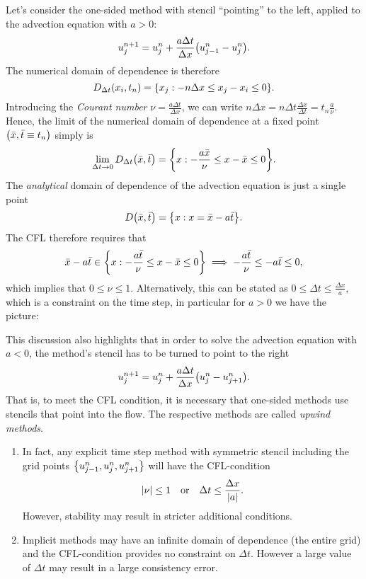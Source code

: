 \begin{example}
	Let's consider the one-sided method with stencil ``pointing'' to the left, applied to the advection equation with \(a > 0\):
	\[
		u_j^{n + 1} = u_j^n + \frac{a\Delta t}{\Delta x}\parentheses*{u_{j - 1}^n - u_j^n}.
	\]
	The numerical domain of dependence is therefore
	\[
		D_{\Delta t}\parentheses*{x_i, t_n} = \braces*{x_j : -n\Delta x \le x_j - x_i \le 0}.
	\]
	Introducing the \emph{Courant number} \(\nu = \frac{a\Delta t}{\Delta x}\), we can write \(n\Delta x = n\Delta t\frac{\Delta x}{\Delta t} = t_n \frac{a}{\nu}\).
	Hence, the limit of the numerical domain of dependence at a fixed point \(\parentheses*{\bar{x}, \bar{t} \equiv t_n}\) simply is
	\[
		\lim_{\Delta t \to 0}D_{\Delta t}\parentheses*{\bar{x}, \bar{t}} = \braces*{x : -\frac{a\bar{x}}{\nu} \le x - \bar{x} \le 0}.
	\]
	The \emph{analytical} domain of dependence of the advection equation is just a single point
	\[
		D\parentheses*{\bar{x}, \bar{t}} = \braces*{x : x = \bar{x} - a\bar{t}}.
	\]
	The CFL therefore requires that
	\[
		\bar{x} - a\bar{t} \in \braces*{x : -\frac{a\bar{t}}{\nu} \le x - \bar{x} \le 0} \implies -\frac{a\bar{t}}{\nu} \le -a\bar{t} \le 0,
	\]
	which implies that \(0 \le \nu \le 1\).
	Alternatively, this can be stated as \(0 \le \Delta t \le \frac{\Delta x}{a}\), which is a constraint on the time step, in particular for \(a > 0\) we have the picture:
	\begin{center}
	\end{center}
	This discussion also highlights that in order to solve the advection equation with \(a < 0\), the method's stencil has to be turned to point to the right
	\[
		u_j^{n + 1} = u_j^n + \frac{a\Delta t}{\Delta x}\parentheses*{u_j^n - u_{j + 1}^n}.
	\]
	That is, to meet the CFL condition, it is necessary that one-sided methods use stencils that point into the flow.
	The respective methods are called \emph{upwind methods}.
\end{example}

\begin{remark}
	\begin{enumerate}
		\item In fact, any explicit time step method with symmetric stencil including the grid points \(\braces*{u_{j - 1}^n, u_j^n, u_{j + 1}^n}\) will have the CFL-condition
		\[
			\absolute*{\nu} \le 1 \quad \text{or} \quad \Delta t \le \frac{\Delta x}{\absolute*{a}}.
		\]
		However, stability may result in stricter additional conditions.
		\item Implicit methods may have an infinite domain of dependence (the entire grid) and the CFL-condition provides no constraint on \(\Delta t\).
		However a large value of \(\Delta t\) may result in a large consistency error.
	\end{enumerate}
\end{remark}


